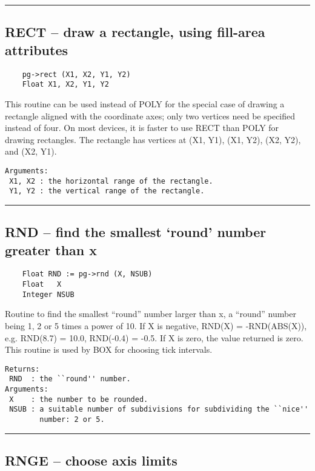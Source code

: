\hrule

\subsection*{RECT -- draw a rectangle, using fill-area attributes }

\begin{verbatim}
    pg->rect (X1, X2, Y1, Y2)
    Float X1, X2, Y1, Y2
\end{verbatim}

This routine can be used instead of POLY for the special case of
drawing a rectangle aligned with the coordinate axes; only two
vertices need be specified instead of four.  On most devices, it is
faster to use RECT than POLY for drawing rectangles.  The rectangle
has vertices at (X1, Y1), (X1, Y2), (X2, Y2), and (X2, Y1).

\begin{verbatim}
Arguments:
 X1, X2 : the horizontal range of the rectangle.
 Y1, Y2 : the vertical range of the rectangle.
\end{verbatim}

\hrule

\subsection*{RND -- find the smallest `round' number greater than x }

\begin{verbatim}
    Float RND := pg->rnd (X, NSUB)
    Float   X
    Integer NSUB
\end{verbatim}

Routine to find the smallest ``round'' number larger than x, a
``round'' number being 1, 2 or 5 times a power of 10.  If X is
negative, RND(X) = -RND(ABS(X)), e.g. RND(8.7) = 10.0, RND(-0.4) =
-0.5.  If X is zero, the value returned is zero.  This routine is used
by BOX for choosing tick intervals.

\begin{verbatim}
Returns:
 RND  : the ``round'' number.
Arguments:
 X    : the number to be rounded.
 NSUB : a suitable number of subdivisions for subdividing the ``nice''
        number: 2 or 5. 
\end{verbatim}

\hrule

\subsection*{RNGE -- choose axis limits }

